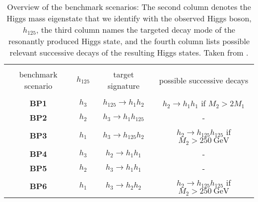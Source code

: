 \begin{center}
\begin{table}
    \centering
{\small
\begin{tabular}{cccc}
        \hline \\
        benchmark scenario & $h_{125}$ & target signature      & possible successive decays                          \\
        \hline \\
        \textbf{BP1}       & $h_3$               & $h_{125} \to h_1 h_2$ & $h_2 \to h_1 h_1$ if $M_2 > 2 M_1$                  \\
        \textbf{BP2}       & $h_2$               & $h_3 \to h_1 h_{125}$ & -                                                   \\
        \textbf{BP3}       & $h_1$               & $h_3 \to h_{125} h_2$ & $h_2 \to h_{125}h_{125}$ if $M_2 > \SI{250}{\GeV}$  \\
        \textbf{BP4}       & $h_3$               & $h_2 \to h_1 h_1$     & -                                                   \\
        \textbf{BP5}       & $h_2$               & $h_3 \to h_1 h_1$     & -                                                   \\
        \textbf{BP6}       & $h_1$               & $h_3 \to h_2 h_2$     & $h_2 \to h_{125}h_{125}$ if  $M_2 > \SI{250}{\GeV}$ \\
        \hline
    \end{tabular}
}
    \caption{Overview of the benchmark scenarios: The second column denotes the
    Higgs mass eigenstate that we identify with the observed Higgs boson,
    $h_{125}$, the third column names the targeted decay mode of the resonantly
    produced Higgs state, and the fourth column lists possible relevant
    successive decays of the resulting Higgs states. Taken from \cite{Robens:2019kga}.}\label{tab:benchmarkoverview}
\end{table}
\end{center}
